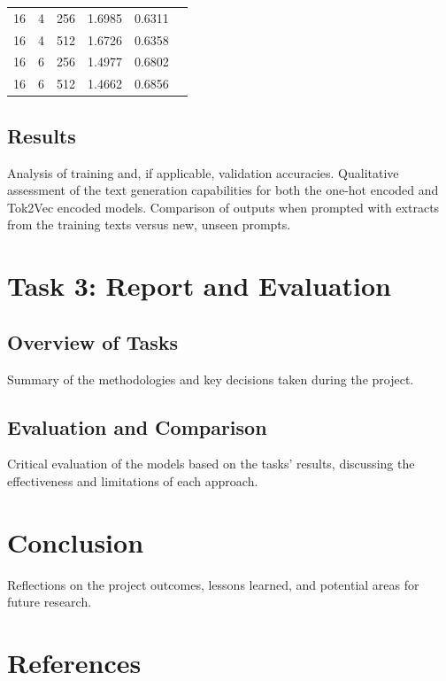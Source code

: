 \documentclass[12pt]{article} \usepackage{COSC420style} \usepackage{soul}
\begin{document}
\begin{table}[htbp]
\begin{tabular}{cccccc}
		16                       & 4                           & 256          & 1.6985        & 0.6311                   \\
		16                       & 4                           & 512          & 1.6726        & 0.6358                   \\
		16                       & 6                           & 256          & 1.4977        & 0.6802                   \\
		16                       & 6                           & 512          & 1.4662        & 0.6856                   \\
		\bottomrule
	\end{tabular}
\end{table}


\subsection{Results}

Analysis of training and, if applicable, validation accuracies. Qualitative assessment of the text
generation capabilities for both the one-hot encoded and Tok2Vec encoded models. Comparison of
outputs when prompted with extracts from the training texts versus new, unseen prompts.

\section{Task 3: Report and Evaluation}

\subsection{Overview of Tasks}

Summary of the methodologies and key decisions taken during the project.

\subsection{Evaluation and Comparison}

Critical evaluation of the models based on the tasks' results, discussing the effectiveness and
limitations of each approach.

\section{Conclusion}

Reflections on the project outcomes, lessons learned, and potential areas for future research.

\section{References}
\end{document}
